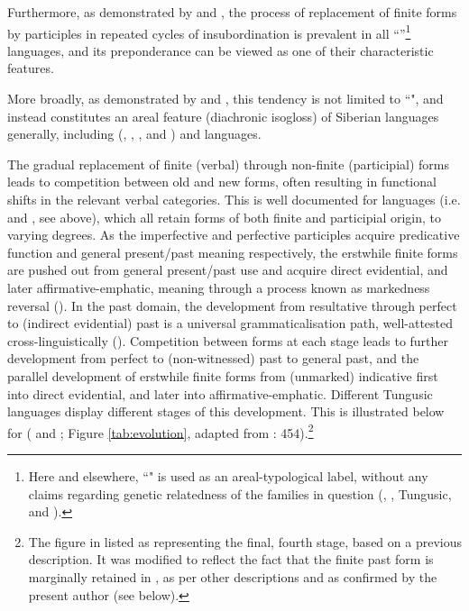\documentclass[output=paper,colorlinks,citecolor=brown]{langscibook}
\begin{document}
Furthermore, as demonstrated by \citet{Robbeets_2009, Robbeets_2015} and \citet{Malchukov_Czerwinski_2020}, the process of replacement of finite forms by participles in repeated cycles of insubordination is prevalent in all ``”\footnote{Here and elsewhere, ``" is used as an areal-typological label, without any claims regarding genetic relatedness of the families in question (, , Tungusic,  and ).} languages, and its preponderance can be viewed as one of their characteristic features.

More broadly, as demonstrated by \citet{Malchukov_2013} and \citet{Malchukov_Czerwinski_2021}, this tendency is not limited to ``", and instead constitutes an areal feature (diachronic isogloss) of Siberian languages generally, including  (, , ,  and ) and  languages.

\begin{sloppypar}
The gradual replacement of finite (verbal) through non-finite (participial) forms leads to competition between old and new forms, often resulting in functional shifts in the relevant verbal categories. This is well documented for  languages (i.e.  and , see  above), which all retain forms of both finite and participial origin, to varying degrees. As the imperfective and perfective participles acquire predicative function and general present/past meaning respectively, the erstwhile finite forms are pushed out from general present/past use and acquire direct evidential, and later affirmative-emphatic, meaning through a process known as markedness reversal (\citealt{Croft_2002}). In the past domain, the development from resultative through perfect to (indirect evidential) past is a universal grammaticalisation path, well-attested cross-linguistically (\citealt{Bybee_1994}). Competition between forms at each stage leads to further development from perfect to (non-witnessed) past to general past, and the parallel development of erstwhile finite forms from (unmarked) indicative first into direct evidential, and later into affirmative-emphatic. Different Tungusic languages display different stages of this development. This is illustrated below for  ( and ; Figure \ref{tab:evolution}, adapted from \citealt{Malchukov_2000}: 454).\footnote{The figure in \citet{Malchukov_2000} listed  as representing the final, fourth stage, based on a previous description. It was modified to reflect the fact that the finite past form is marginally retained in , as per other descriptions and as confirmed by the present author (see  below).}
\end{sloppypar}\largerpage
\end{document}
